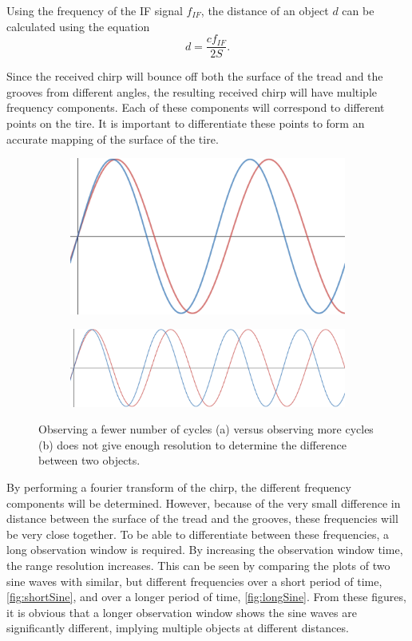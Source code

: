 \documentclass[11pt]{IEEEtran}
\begin{document}
		Using the frequency of the IF signal $f_{IF}$, the distance of an object $d$ can be calculated using the equation
		\begin{equation}
			d = \frac{cf_{IF}}{2S}.
		\end{equation}

		Since the received chirp will bounce off both the surface of the tread and the grooves from different angles, the resulting received chirp will have multiple frequency components. Each of these components will correspond to different points on the tire. It is important to differentiate these points to form an accurate mapping of the surface of the tire. 

		\begin{figure}[tbp]
			\centering
			\begin{subfigure}[b]{\linewidth}
				\includegraphics[width=0.5\linewidth,keepaspectratio]{shortSine.png}
				\caption{}
				\label{fig:shortSine}
			\end{subfigure} %
			\begin{subfigure}[b]{\linewidth}
				\includegraphics[width=\linewidth,keepaspectratio]{longSine.png}
				\caption{}
				\label{fig:longSine}
			\end{subfigure} %
			\caption{Observing a fewer number of cycles (a) versus observing more cycles (b) does not give enough resolution to determine the difference between two objects.}
			\label{fig:LongvShortSine}
		\end{figure}%

		By performing a fourier transform of the chirp, the different frequency components will be determined. However, because of the very small difference in distance between the surface of the tread and the grooves, these frequencies will be very close together. To be able to differentiate between these frequencies, a long observation window is required. By increasing the observation window time, the range resolution increases. This can be seen by comparing the plots of two sine waves with similar, but different frequencies over a short period of time, \autoref{fig:shortSine}, and over a longer period of time, \autoref{fig:longSine}. From these figures, it is obvious that a longer observation window shows the sine waves are significantly different, implying multiple objects at different distances.
\end{document}
